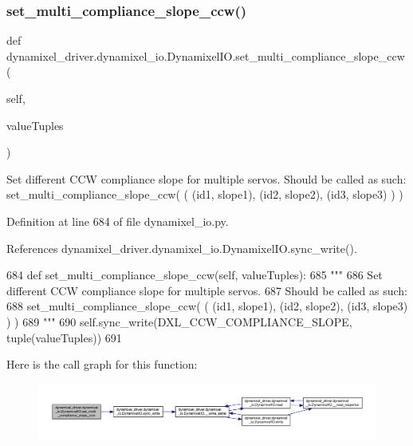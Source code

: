 \subsubsection{\texorpdfstring{set\+\_\+multi\+\_\+compliance\+\_\+slope\+\_\+ccw()}{set\_multi\_compliance\_slope\_ccw()}}
{\footnotesize\ttfamily def dynamixel\+\_\+driver.\+dynamixel\+\_\+io.\+Dynamixel\+I\+O.\+set\+\_\+multi\+\_\+compliance\+\_\+slope\+\_\+ccw (\begin{DoxyParamCaption}\item[{}]{self,  }\item[{}]{value\+Tuples }\end{DoxyParamCaption})}

\begin{DoxyVerb}Set different CCW compliance slope for multiple servos.
Should be called as such:
set_multi_compliance_slope_ccw( ( (id1, slope1), (id2, slope2), (id3, slope3) ) )
\end{DoxyVerb}
 

Definition at line 684 of file dynamixel\+\_\+io.\+py.



References dynamixel\+\_\+driver.\+dynamixel\+\_\+io.\+Dynamixel\+I\+O.\+sync\+\_\+write().


\begin{DoxyCode}
684     \textcolor{keyword}{def }set\_multi\_compliance\_slope\_ccw(self, valueTuples):
685         \textcolor{stringliteral}{"""}
686 \textcolor{stringliteral}{        Set different CCW compliance slope for multiple servos.}
687 \textcolor{stringliteral}{        Should be called as such:}
688 \textcolor{stringliteral}{        set\_multi\_compliance\_slope\_ccw( ( (id1, slope1), (id2, slope2), (id3, slope3) ) )}
689 \textcolor{stringliteral}{        """}
690         self.sync\_write(DXL\_CCW\_COMPLIANCE\_SLOPE, tuple(valueTuples))
691 
\end{DoxyCode}
Here is the call graph for this function\+:
\nopagebreak
\begin{figure}[H]
\begin{center}
\leavevmode
\includegraphics[width=350pt]{dd/d77/classdynamixel__driver_1_1dynamixel__io_1_1_dynamixel_i_o_a3c59c5ea5e5e0262fc43d0b2603ca444_cgraph}
\end{center}
\end{figure}
\mbox{\label{classdynamixel__driver_1_1dynamixel__io_1_1_dynamixel_i_o_a115695cc45ce343d0787fcc3c0bf6e7b}} 
